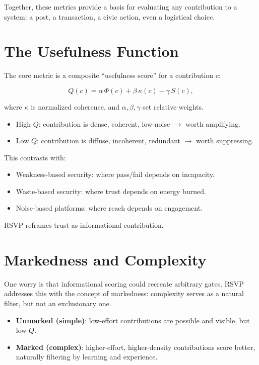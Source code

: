\documentclass[openany]{book}
\begin{document}
Together, these metrics provide a basis for evaluating any contribution to a system: a post, a transaction, a civic action, even a logistical choice.

\section{The Usefulness Function}

The core metric is a composite ``usefulness score'' for a contribution $c$:

\[ Q(c) = \alpha \, \Phi(c) + \beta \, \kappa(c) - \gamma \, S(c), \]

where $\kappa$ is normalized coherence, and $\alpha, \beta, \gamma$ set relative weights.

\begin{itemize}
    \item High $Q$: contribution is dense, coherent, low-noise $\rightarrow$ worth amplifying.
    \item Low $Q$: contribution is diffuse, incoherent, redundant $\rightarrow$ worth suppressing.
\end{itemize}

This contrasts with:

\begin{itemize}
    \item Weakness-based security: where pass/fail depends on incapacity.
    \item Waste-based security: where trust depends on energy burned.
    \item Noise-based platforms: where reach depends on engagement.
\end{itemize}

RSVP reframes trust as informational contribution.

\section{Markedness and Complexity}

One worry is that informational scoring could recreate arbitrary gates. RSVP addresses this with the concept of markedness: complexity serves as a natural filter, but not an exclusionary one.

\begin{itemize}
    \item \textbf{Unmarked (simple)}: low-effort contributions are possible and visible, but low $Q$.
    \item \textbf{Marked (complex)}: higher-effort, higher-density contributions score better, naturally filtering by learning and experience.
\end{itemize}
\end{document}
